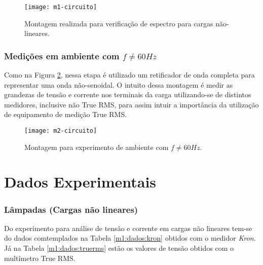 \documentclass[a4paper,12pt,oneside,openany,table,xcdraw]{article}
\begin{document}
\vspace{1.5cm}
\begin{figure}[H]
\centering
\texttt{[image: m1-circuito]}
\caption{Montagem realizada para verificação de espectro para cargas não-lineares.}
\label{m1:esquema}
\end{figure}

\newpage
\subsubsection{Medições em ambiente com $f\ne 60Hz$}
Como na Figura \ref{m2:esquema}, nessa etapa é utilizado um retificador de onda completa para representar uma onda não-senoidal. O intuito dessa montagem é medir as grandezas de tensão e corrente nos terminais da carga utilizando-se de distintos medidores, inclusive não True RMS, para assim intuir a importância da utilização de equipamento de medição True RMS.

\vspace{1.5cm}
\begin{figure}[H]
\centering
\texttt{[image: m2-circuito]}
\caption{Montagem para experimento de ambiente com $f\ne 60Hz$.}
\label{m2:esquema}
\end{figure}
\vspace{0.1cm}


\newpage
\section{Dados Experimentais} \label{dados}

\subsubsection{Lâmpadas (Cargas não lineares)}
Do experimento para análise de tensão e corrente em cargas não lineares tem-se do dados comtemplados na Tabela \ref{m1:dados:kron} obtidos com o medidor \emph{Kron}. Já na Tabela \ref{m1:dados:truerms} estão os valores de tensão obtidos com o multímetro True RMS.
\end{document}
